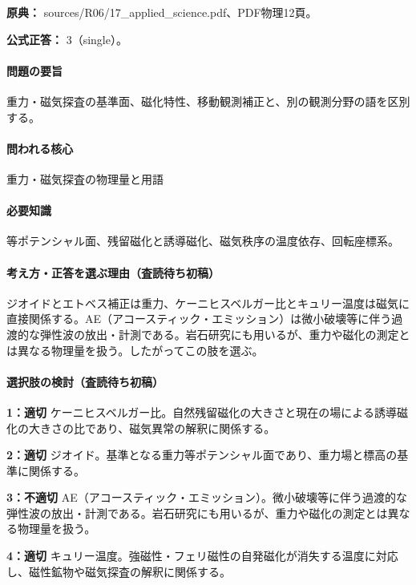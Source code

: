 \noindent\textbf{原典：} sources/R06/17\_applied\_science.pdf、PDF物理12頁。

\textbf{公式正答：} 3（single）。

\paragraph{問題の要旨} 重力・磁気探査の基準面、磁化特性、移動観測補正と、別の観測分野の語を区別する。

\paragraph{問われる核心} 重力・磁気探査の物理量と用語

\paragraph{必要知識} 等ポテンシャル面、残留磁化と誘導磁化、磁気秩序の温度依存、回転座標系。

\paragraph{考え方・正答を選ぶ理由（査読待ち初稿）} ジオイドとエトベス補正は重力、ケーニヒスベルガー比とキュリー温度は磁気に直接関係する。AE（アコースティック・エミッション）は微小破壊等に伴う過渡的な弾性波の放出・計測である。岩石研究にも用いるが、重力や磁化の測定とは異なる物理量を扱う。したがってこの肢を選ぶ。

\paragraph{選択肢の検討（査読待ち初稿）}\mbox{}\par

\noindent\textbf{1：適切} ケーニヒスベルガー比。自然残留磁化の大きさと現在の場による誘導磁化の大きさの比であり、磁気異常の解釈に関係する。\par

\noindent\textbf{2：適切} ジオイド。基準となる重力等ポテンシャル面であり、重力場と標高の基準に関係する。\par

\noindent\textbf{3：不適切} AE（アコースティック・エミッション）。微小破壊等に伴う過渡的な弾性波の放出・計測である。岩石研究にも用いるが、重力や磁化の測定とは異なる物理量を扱う。\par

\noindent\textbf{4：適切} キュリー温度。強磁性・フェリ磁性の自発磁化が消失する温度に対応し、磁性鉱物や磁気探査の解釈に関係する。\par

